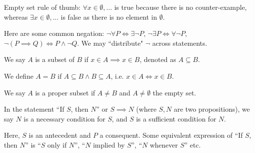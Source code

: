\documentclass[11pt]{article}
\begin{document}
\vspace{5pt}Empty set rule of thumb: \(\forall x \in \emptyset, ...\) is true because there is no counter-example, whereas \(\exists x \in \emptyset, ...\) is false as there is no element in \(\emptyset\).

\vspace{5pt}Here are some common negation: \(\lnot \forall P \iff \exists \lnot P\), \(\lnot \exists P \iff \forall \lnot P\), \(\lnot(P \implies Q) \iff P \land \lnot Q\). We may ``distribute" \(\lnot\) across statements.

\begin{definition}
  We say \(A\) is a subset of \(B\) if \(x\in A \implies x\in B\), denoted as \(A\subseteq B\).

  \vspace{5pt}We define \(A=B\) if \(A\subseteq B \land B \subseteq A\), i.e. \(x\in A \iff x\in B\).

  \vspace{5pt}We say \(A\) is a proper subset if \(A \neq B\) and \(A\neq \emptyset\) the empty set.
\end{definition}

\begin{definition}
  In the statement ``If \(S\), then \(N\)'' or \(S\implies N\) (where \(S,N\) are two propositions), we say \(N\) is a necessary condition for \(S\), and \(S\) is a sufficient condition for \(N\).
\end{definition}
Here, \(S\) is an antecedent and \(P\) a consequent. Some equivalent expression of ``If \(S\), then \(N\)'' is ``\(S\) only if \(N\)'', ``\(N\) implied by \(S\)'', ``\(N\) whenever \(S\)'' etc.
\end{document}
